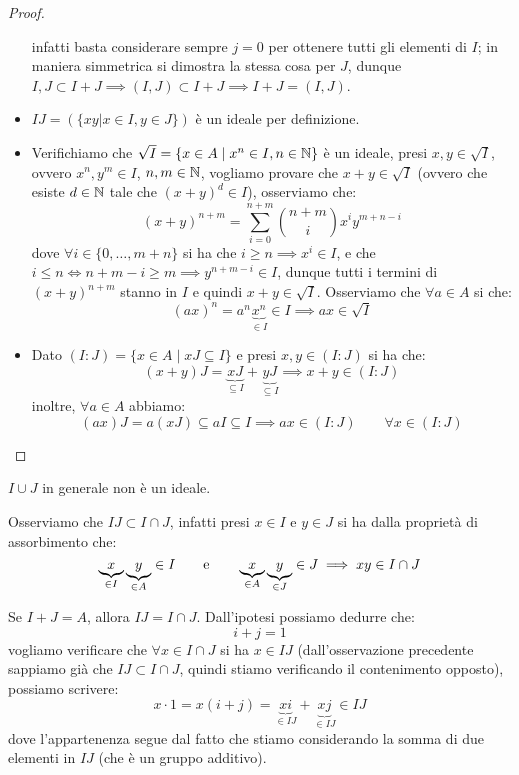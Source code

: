 \documentclass[11pt]{scrartcl}
\begin{document}
\begin{proof}
\begin{itemize}
            infatti basta considerare sempre $j = 0$ per ottenere tutti gli elementi di $I$; in maniera simmetrica si dimostra la stessa cosa per $J$, dunque $I,J \subset I + J \implies (I,J) \subset I + J \implies I + J = (I,J)$.
        \item $IJ = (\{xy | x \in I, y \in J\})$ è un ideale per definizione.
        \item Verifichiamo che $\sqrt{I} = \{x \in A \mid x^n \in I, n \in \mathbb N\}$ è un ideale, presi $x,y \in \sqrt{I}$, ovvero $x^n,y^m \in I$, $n,m \in \mathbb N$, vogliamo 
            provare che $x + y \in \sqrt{I}$ (ovvero che esiste $d \in \mathbb N$ tale che $(x+y)^d \in I$), osserviamo che:
                \[ (x + y)^{n + m} = \sum_{i = 0}^{n + m} \binom{n+m}{i} x^i y^{m+n-i}
                    \]
            dove $\forall i \in \{0,\ldots,m+n\}$ si ha che $i \geq n \implies x^i \in I$, e che $i \leq n \iff n+m-i \geq m \implies y^{n+m-i} \in I$, dunque tutti i termini di $(x+y)^{n+m}$ stanno in $I$
            e quindi $x + y \in \sqrt{I}$. Osserviamo che $\forall a \in A$ si che:
                \[ (ax)^n = a^n\underbrace{x^n}_{\in I} \in I \implies ax \in \sqrt{I}
                    \]
        \item Dato $(I : J) = \{x \in A \mid xJ \subseteq I\}$ e presi $x,y \in (I : J)$ si ha che:
            \[ (x+y)J = \underbrace{xJ}_{\subseteq I} + \underbrace{yJ}_{\subseteq I} \implies x+y \in (I:J)
                \]
        inoltre, $\forall a \in A$ abbiamo:
            \[ (ax)J = a(xJ) \subseteq aI \subseteq I \implies ax \in (I:J) \qquad \forall x \in (I:J)
                \]
    \end{itemize}
\end{proof}

\begin{remark}[$I \cup J$]
    $I \cup J$ in generale non è un ideale.
\end{remark}

\begin{remark}
    Osserviamo che $IJ \subset I \cap J$, infatti presi $x \in I$ e $y \in J$ si ha dalla proprietà di assorbimento che:
        \[ \underbrace{x}_{\in I}\underbrace{y}_{\in A} \in I \qquad \text e \qquad \underbrace{x}_{\in A}\underbrace{y}_{\in J} \in  J \implies xy \in I \cap J
            \]
\end{remark}

\begin{remark}[$IJ = I \cap J$]
    \label{2.24}
    Se $I + J = A$, allora $IJ = I \cap J$. Dall'ipotesi possiamo dedurre che:
        \[ i+j = 1
            \]
    vogliamo verificare che $\forall x \in I \cap J$ si ha $x \in IJ$ (dall'osservazione precedente 
    sappiamo già che $IJ \subset I \cap J$, quindi stiamo verificando il contenimento opposto), possiamo scrivere:
        \[ x \cdot 1 = x(i+j) = \underbrace{xi}_{\in IJ} + \underbrace{xj}_{\in IJ} \in IJ
            \]
    dove l'appartenenza segue dal fatto che stiamo considerando la somma di due elementi in $IJ$ (che è un gruppo additivo).
\end{remark}
\end{document}
